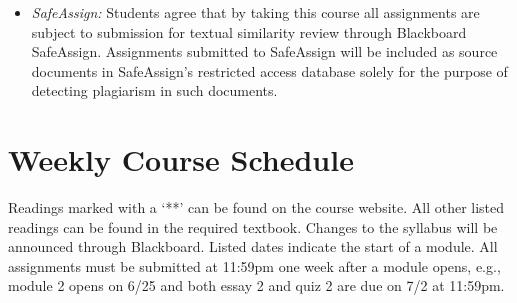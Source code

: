 \documentclass[article,oneside]{memoir}
\begin{document}
\begin{itemize}
\item \textit{SafeAssign:} Students agree that by taking this course all assignments are subject to submission for textual similarity review through Blackboard SafeAssign. Assignments submitted to SafeAssign will be included as source documents in SafeAssign's restricted access database solely for the purpose of detecting plagiarism in such documents.  


\end{itemize}



\section{Weekly Course Schedule}
Readings marked with a `**' can be found on the course website. All other listed readings can be found in the required textbook. Changes to the syllabus will be announced through Blackboard. Listed dates indicate the start of a module.  All assignments must be submitted at 11:59pm one week after a module opens, e.g., module 2 opens on 6/25 and both essay 2 and quiz 2 are due on 7/2 at 11:59pm.  \newline
\end{document}
